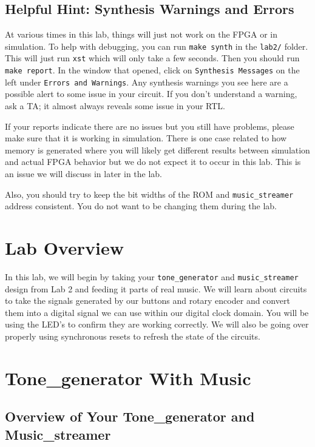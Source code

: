 \documentclass[11pt]{article}
\begin{document}
\subsection{Helpful Hint: Synthesis Warnings and Errors}
At various times in this lab, things will just not work on the FPGA or in simulation. To help with debugging, you can run \verb|make synth| in the \verb|lab2/| folder. This will just run \verb|xst| which will only take a few seconds. Then you should run \verb|make report|. In the window that opened, click on \verb|Synthesis Messages| on the left under \verb|Errors and Warnings|. Any synthesis warnings you see here are a possible alert to some issue in your circuit. If you don't understand a warning, ask a TA; it almost always reveals some issue in your RTL.

If your reports indicate there are no issues but you still have problems, please make sure that it is working in simulation. There is one case related to how memory is generated where you will likely get different results between simulation and actual FPGA behavior but we do not expect it to occur in this lab. This is an issue we will discuss in later in the lab. 

Also, you should try to keep the bit widths of the ROM and \verb|music_streamer| address consistent. You do not want to be changing them during the lab.

\section{Lab Overview}

In this lab, we will begin by taking your \verb|tone_generator| and \verb|music_streamer| design from Lab 2 and feeding it parts of real music. We will learn about circuits to take the signals generated by our buttons and rotary encoder and convert them into a digital signal we can use within our digital clock domain. You will be using the LED's to confirm they are working correctly. We will also be going over properly using synchronous resets to refresh the state of the circuits. 

\section{Tone\_generator With Music}

\subsection{Overview of Your Tone\_generator and Music\_streamer}
\end{document}
